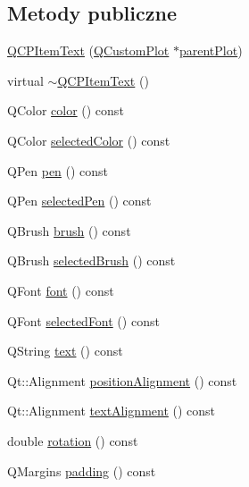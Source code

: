 \subsection*{Metody publiczne}
\begin{DoxyCompactItemize}
\item 
\hyperlink{class_q_c_p_item_text_a77ff96a2972a00872ff8f8c67143abbe}{Q\+C\+P\+Item\+Text} (\hyperlink{class_q_custom_plot}{Q\+Custom\+Plot} $\ast$\hyperlink{class_q_c_p_layerable_ab7e0e94461566093d36ffc0f5312b109}{parent\+Plot})
\item 
virtual \hyperlink{class_q_c_p_item_text_a1efd41ca53d49042d4f4b63cf9615cb6}{$\sim$\+Q\+C\+P\+Item\+Text} ()
\item 
Q\+Color \hyperlink{class_q_c_p_item_text_ac9cb0a8a27f64d1b40855910ea9ebd03}{color} () const 
\item 
Q\+Color \hyperlink{class_q_c_p_item_text_a44f690ec0ba6a32e518f2e923c002e39}{selected\+Color} () const 
\item 
Q\+Pen \hyperlink{class_q_c_p_item_text_a552bd02f46dbcb4b4812559036893352}{pen} () const 
\item 
Q\+Pen \hyperlink{class_q_c_p_item_text_a70c86ec95133d3e904d1718023fe3c4e}{selected\+Pen} () const 
\item 
Q\+Brush \hyperlink{class_q_c_p_item_text_a38b981dfacb703efa8e27346eebcb5a2}{brush} () const 
\item 
Q\+Brush \hyperlink{class_q_c_p_item_text_ac6802bbceff1ade0053166c64a5a6966}{selected\+Brush} () const 
\item 
Q\+Font \hyperlink{class_q_c_p_item_text_ad34943fd68a9b1451d3e3234d072e418}{font} () const 
\item 
Q\+Font \hyperlink{class_q_c_p_item_text_af2e7cacb1975132508714a51c5f48c3b}{selected\+Font} () const 
\item 
Q\+String \hyperlink{class_q_c_p_item_text_a9547f7832010486abed0837e75db5330}{text} () const 
\item 
Qt\+::\+Alignment \hyperlink{class_q_c_p_item_text_af13c6adc480f268116ae72196eb44b06}{position\+Alignment} () const 
\item 
Qt\+::\+Alignment \hyperlink{class_q_c_p_item_text_aaa1d84b3f61f9f2a0cce230e66ef7194}{text\+Alignment} () const 
\item 
double \hyperlink{class_q_c_p_item_text_ae8991207fa1697511c1c8af9f3ca0e0a}{rotation} () const 
\item 
Q\+Margins \hyperlink{class_q_c_p_item_text_a00e0fa03822ff384bf4921c1c90322ff}{padding} () const 
\item 

\end{DoxyCompactItemize}
